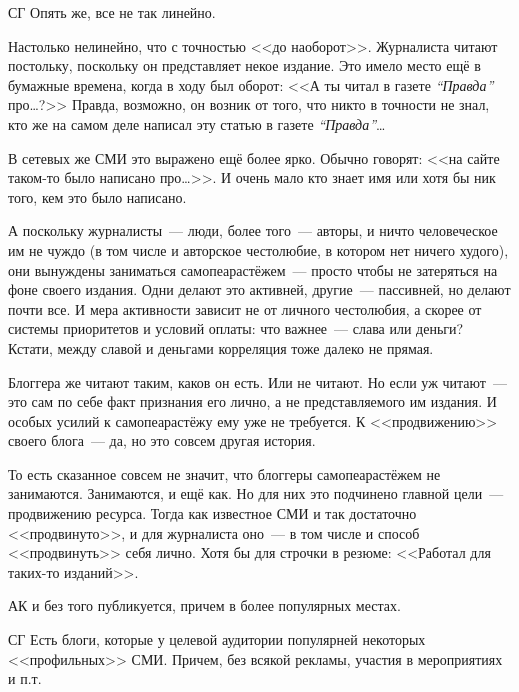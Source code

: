 \begin{shadequote}[r]{СГ}
Опять же, все не так линейно.
\end{shadequote}

Настолько нелинейно, что с точностью <<до наоборот>>. Журналиста читают постольку, поскольку он представляет некое издание. Это имело место ещё в бумажные времена, когда в ходу был оборот: <<А ты читал в газете \textit{``Правда''} про\dots?>> Правда, возможно, он возник от того, что никто в точности не знал, кто же на самом деле написал эту статью в газете \textit{``Правда''}\dots

В сетевых же СМИ это выражено ещё более ярко. Обычно говорят: <<на сайте таком-то было написано про\dots>>. И очень мало кто знает имя или хотя бы ник того, кем это было написано.

А поскольку журналисты~--- люди, более того~--- авторы, и ничто человеческое им не чуждо (в том числе и авторское честолюбие, в котором нет ничего худого), они вынуждены заниматься самопеарастёжем~--- просто чтобы не затеряться на фоне своего издания. Одни делают это активней, другие~--- пассивней, но делают почти все. И мера активности зависит не от личного честолюбия, а скорее от системы приоритетов и условий оплаты: что важнее~--- слава или деньги? Кстати, между славой и деньгами корреляция тоже далеко не прямая.

Блоггера же читают таким, каков он есть. Или не читают. Но если уж читают~--- это сам по себе факт признания его лично, а не представляемого им издания. И особых усилий к самопеарастёжу ему уже не требуется. К <<продвижению>> своего блога~--- да, но это совсем другая история.

То есть сказанное совсем не значит, что блоггеры самопеарастёжем не занимаются. Занимаются, и ещё как. Но для них это подчинено главной цели~--- продвижению ресурса. Тогда как известное СМИ и так достаточно <<продвинуто>>, и для журналиста оно~--- в том числе и способ <<продвинуть>> себя лично. Хотя бы для строчки в резюме: <<Работал для таких-то изданий>>.

\begin{shadequote}[r]{АК}
 и без того публикуется, причем в более популярных местах.
\end{shadequote}


\begin{shadequote}[r]{СГ}
Есть блоги, которые у целевой аудитории популярней некоторых <<профильных>> СМИ. Причем, без всякой рекламы, участия в мероприятиях и п.т.
\end{shadequote}

